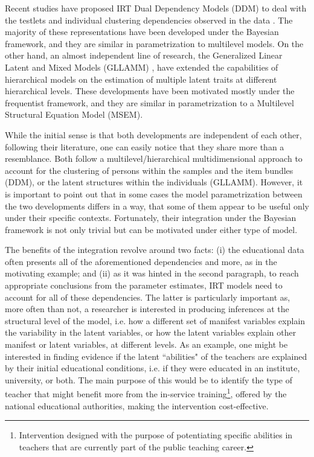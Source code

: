 Recent studies have proposed IRT Dual Dependency Models (DDM) to deal with the testlets and individual clustering dependencies observed in the data \cite{Fujimoto_2020, Fujimoto_2018a, Fujimoto_2018b, Jiao_et_al_2012, Flores_2012, Fox_2010, Reckase_2009, Bradlow_1999}. The majority of these representations have been developed under the Bayesian framework, and they are similar in parametrization to multilevel models. On the other hand, an almost independent line of research, the Generalized Linear Latent and Mixed Models (GLLAMM) \cite{Rabe_et_al_2004a, Rabe_et_al_2004b, Skrondal_et_al_2004a, Rabe_et_al_2012}, have extended the capabilities of hierarchical models on the estimation of multiple latent traits at different hierarchical levels. These developments have been motivated mostly under the frequentist framework, and they are similar in parametrization to a Multilevel Structural Equation Model (MSEM).

While the initial sense is that both developments are independent of each other, following their literature, one can easily notice that they share more than a resemblance. Both follow a multilevel/hierarchical multidimensional approach to account for the clustering of persons within the samples and the item bundles (DDM), or the latent structures within the individuals (GLLAMM). However, it is important to point out that in some cases the model parametrization between the two developments differs in a way, that some of them appear to be useful only under their specific contexts. Fortunately, their integration under the Bayesian framework is not only trivial but can be motivated under either type of model.

The benefits of the integration revolve around two facts: (i) the educational data often presents all of the aforementioned dependencies and more, as in the motivating example; and (ii) as it was hinted in the second paragraph, to reach appropriate conclusions from the parameter estimates, IRT models need to account for all of these dependencies. The latter is particularly important as, more often than not, a researcher is interested in producing inferences at the structural level of the model, i.e. how a different set of manifest variables explain the variability in the latent variables, or how the latent variables explain other manifest or latent variables, at different levels. As an example, one might be interested in finding evidence if the latent ``abilities" of the teachers are explained by their initial educational conditions, i.e. if they were educated in an institute, university, or both. The main purpose of this would be to identify the type of teacher that might benefit more from the in-service training\footnote{Intervention designed with the purpose of potentiating specific abilities in teachers that are currently part of the public teaching career.}, offered by the national educational authorities, making the intervention cost-effective.

